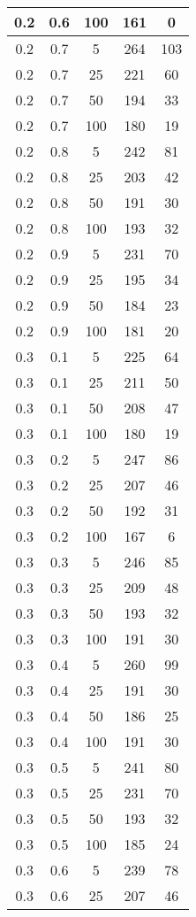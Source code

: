 \begin{appendices}
\begin{center}
\begin{longtable}[c]{|c|c|c|c|c|}
		\hline
		0.2& 0.6& 100& 161& 0\\
		\hline
		0.2& 0.7& 5& 264&  103\\
		\hline
		0.2& 0.7& 25& 221&  60\\
		\hline
		0.2& 0.7& 50& 194&  33\\
		\hline
		0.2& 0.7& 100& 180&  19\\
		\hline
		0.2& 0.8& 5& 242&  81\\
		\hline
		0.2& 0.8& 25& 203&  42\\
		\hline
		0.2& 0.8& 50& 191&  30\\
		\hline
		0.2& 0.8& 100& 193&  32\\
		\hline
		0.2& 0.9& 5& 231&  70\\
		\hline
		0.2& 0.9& 25& 195&  34\\
		\hline
		0.2& 0.9& 50& 184&  23\\
		\hline
		0.2& 0.9& 100& 181&  20\\
		\hline
		0.3& 0.1& 5& 225&  64\\
		\hline
		0.3& 0.1& 25& 211&  50\\
		\hline
		0.3& 0.1& 50& 208&  47\\
		\hline
		0.3& 0.1& 100& 180&  19\\
		\hline
		0.3& 0.2& 5& 247&  86\\
		\hline
		0.3& 0.2& 25& 207&  46\\
		\hline
		0.3& 0.2& 50& 192&  31\\
		\hline
		0.3& 0.2& 100& 167&  6\\
		\hline
		0.3& 0.3& 5& 246&  85\\
		\hline
		0.3& 0.3& 25& 209&  48\\
		\hline
		0.3& 0.3& 50& 193&  32\\
		\hline
		0.3& 0.3& 100& 191&  30\\
		\hline
		0.3& 0.4& 5& 260&  99\\
		\hline
		0.3& 0.4& 25& 191&  30\\
		\hline
		0.3& 0.4& 50& 186&  25\\
		\hline
		0.3& 0.4& 100& 191&  30\\
		\hline
		0.3& 0.5& 5& 241&  80\\
		\hline
		0.3& 0.5& 25& 231&  70\\
		\hline
		0.3& 0.5& 50& 193&  32\\
		\hline
		0.3& 0.5& 100& 185&  24\\
		\hline
		0.3& 0.6& 5& 239&  78\\
		\hline
		0.3& 0.6& 25& 207&  46\\

\end{longtable}
\end{center}
\end{appendices}
